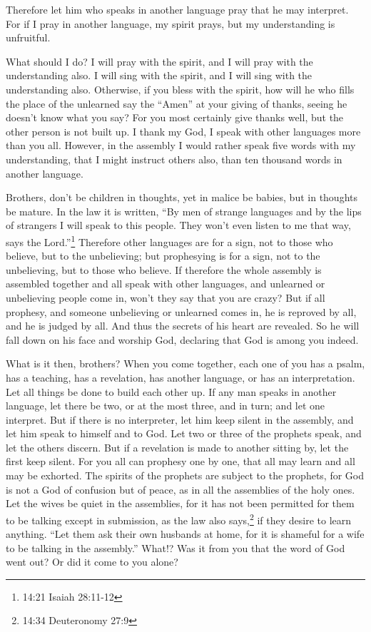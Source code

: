 \myverse{}Therefore let him who speaks in another language pray that he
may interpret.
\myverse{}For if I pray in another language, my spirit prays, but my understanding
is unfruitful.

\myverse{}What should I do? I will pray with the spirit, and I will pray
with the understanding also. I will sing with the spirit, and I will sing with the understanding also.
\myverse{}Otherwise, if you bless with the spirit, how will he who fills the place
of the unlearned say the “Amen” at your giving of thanks, seeing he doesn’t know what you say?
\myverse{}For you most certainly give thanks well, but the other person is not built
up.
\myverse{}I thank my God, I speak with other languages more than you all.
\myverse{}However, in the assembly I would rather speak five words with my understanding,
that I might instruct others also, than ten thousand words in another language.

\myverse{}Brothers, don’t be children in thoughts, yet in malice be babies,
but in thoughts be mature.
\myverse{}In the law it is written, “By men of strange languages and by the lips of
strangers I will speak to this people. They won’t even listen to me that way, says the Lord.”\footnote{14:21 Isaiah 28:11-12}
\myverse{}Therefore other languages are for a sign, not to those who believe, but to
the unbelieving; but prophesying is for a sign, not to the unbelieving, but to those who believe.
\myverse{}If therefore the whole assembly is assembled together and all speak with
other languages, and unlearned or unbelieving people come in, won’t they say that you are crazy?
\myverse{}But if all prophesy, and someone unbelieving or unlearned comes in, he is
reproved by all, and he is judged by all.
\myverse{}And thus the secrets of his heart are revealed. So he will fall down on his
face and worship God, declaring that God is among you indeed.

\myverse{}What is it then, brothers? When you come together, each one
of you has a psalm, has a teaching, has a revelation, has another language, or has an interpretation.
Let all things be done to build each other up.
\myverse{}If any man speaks in another language, let there be two, or at the most three,
and in turn; and let one interpret.
\myverse{}But if there is no interpreter, let him keep silent in the assembly, and
let him speak to himself and to God.
\myverse{}Let two or three of the prophets speak, and let the others discern.
\myverse{}But if a revelation is made to another sitting by, let the first keep silent.
\myverse{}For you all can prophesy one by one, that all may learn and all may be exhorted.
\myverse{}The spirits of the prophets are subject to the prophets,
\myverse{}for God is not a God of confusion but of peace, as in all the assemblies
of the holy ones.
\myverse{}Let the wives be quiet in the assemblies, for it has not been permitted for
them to be talking except in submission, as the law also says,\footnote{14:34 Deuteronomy 27:9}
\myverse{}if they desire to learn anything. “Let them ask their own husbands at home,
for it is shameful for a wife to be talking in the assembly.”
\myverse{}What!? Was it from you that the word of God went out? Or did it come to you
alone?


